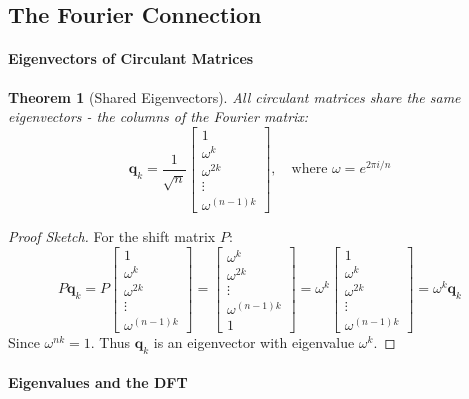 \documentclass{article}
\newtheorem{theorem}{Theorem}
\begin{document}
\subsection{The Fourier Connection}

\paragraph{Eigenvectors of Circulant Matrices}

\begin{theorem}[Shared Eigenvectors]
All circulant matrices share the same eigenvectors - the columns of the Fourier matrix:
\[
\mathbf{q}_k = \frac{1}{\sqrt{n}} \begin{bmatrix} 1 \\ \omega^k \\ \omega^{2k} \\ \vdots \\ \omega^{(n-1)k} \end{bmatrix}, \quad \text{where } \omega = e^{2\pi i/n}
\]
\end{theorem}

\begin{proof}[Proof Sketch]
For the shift matrix $P$:
\[
P\mathbf{q}_k = P \begin{bmatrix} 1 \\ \omega^k \\ \omega^{2k} \\ \vdots \\ \omega^{(n-1)k} \end{bmatrix} = \begin{bmatrix} \omega^k \\ \omega^{2k} \\ \vdots \\ \omega^{(n-1)k} \\ 1 \end{bmatrix} = \omega^k \begin{bmatrix} 1 \\ \omega^k \\ \omega^{2k} \\ \vdots \\ \omega^{(n-1)k} \end{bmatrix} = \omega^k \mathbf{q}_k
\]
Since $\omega^{nk} = 1$. Thus $\mathbf{q}_k$ is an eigenvector with eigenvalue $\omega^k$.
\end{proof}

\paragraph{Eigenvalues and the DFT}
\end{document}
